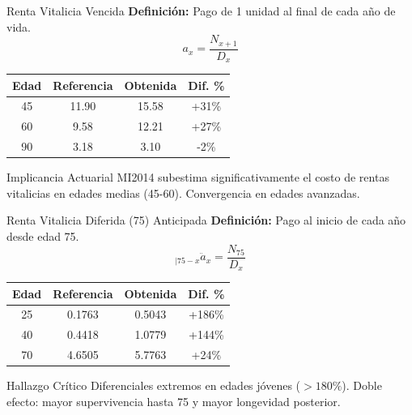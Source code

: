 \begin{frame}{Renta Vitalicia Vencida}
  \textbf{Definición:} Pago de 1 unidad al final de cada año de vida.
  \[ a_x = \frac{N_{x+1}}{D_x} \]

  \begin{table}
    \centering
    \begin{tabular}{cccc}
      \toprule
      \textbf{Edad} & \textbf{Referencia} & \textbf{Obtenida} & \textbf{Dif. \%} \\
      \midrule
      45 & 11.90 & 15.58 & +31\% \\
      60 & 9.58 & 12.21 & +27\% \\
      90 & 3.18 & 3.10 & -2\% \\
      \bottomrule
    \end{tabular}
  \end{table}
  
  \begin{block}{Implicancia Actuarial}
    MI2014 subestima significativamente el costo de rentas vitalicias en edades medias (45-60). Convergencia en edades avanzadas.
  \end{block}
\end{frame}

\begin{frame}{Renta Vitalicia Diferida (75) Anticipada}
  \textbf{Definición:} Pago al inicio de cada año desde edad 75.
  \[ {}_{|75-x}\ddot{a}_x = \frac{N_{75}}{D_x} \]

  \begin{table}
    \centering
    \begin{tabular}{cccc}
      \toprule
      \textbf{Edad} & \textbf{Referencia} & \textbf{Obtenida} & \textbf{Dif. \%} \\
      \midrule
      25 & 0.1763 & 0.5043 & +186\% \\
      40 & 0.4418 & 1.0779 & +144\% \\
      70 & 4.6505 & 5.7763 & +24\% \\
      \bottomrule
    \end{tabular}
  \end{table}
  
  \begin{alertblock}{Hallazgo Crítico}
    Diferenciales extremos en edades jóvenes ($>180\%$). Doble efecto: mayor supervivencia hasta 75 y mayor longevidad posterior.
  \end{alertblock}
\end{frame}

